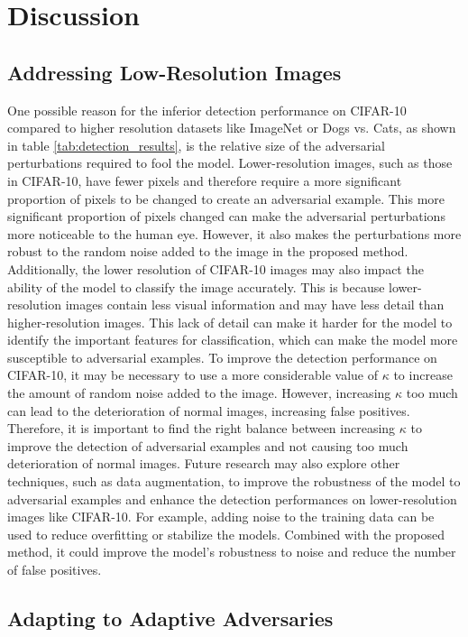 \chapter{Discussion}
\label{discussion}
\overridetextsize

\section{Addressing Low-Resolution Images}

One possible reason for the inferior detection performance on CIFAR-10 compared
to higher resolution datasets like ImageNet or Dogs vs. Cats, as shown in table
\ref{tab:detection_results}, is the relative size of the adversarial
perturbations required to fool the model. Lower-resolution images, such as those
in CIFAR-10, have fewer pixels and therefore require a more significant
proportion of pixels to be changed to create an adversarial example. This more
significant proportion of pixels changed can make the adversarial perturbations
more noticeable to the human eye. However, it also makes the perturbations more
robust to the random noise added to the image in the proposed method.
Additionally, the lower resolution of CIFAR-10 images may also impact the
ability of the model to classify the image accurately. This is because
lower-resolution images contain less visual information and may have less detail
than higher-resolution images. This lack of detail can make it harder for the
model to identify the important features for classification, which can make the
model more susceptible to adversarial examples. To improve the detection
performance on CIFAR-10, it may be necessary to use a more considerable value of
$\kappa$ to increase the amount of random noise added to the image. However,
increasing $\kappa$ too much can lead to the deterioration of normal images,
increasing false positives. Therefore, it is important to find the right balance
between increasing $\kappa$ to improve the detection of adversarial examples and
not causing too much deterioration of normal images. Future research may also
explore other techniques, such as data augmentation, to improve the robustness
of the model to adversarial examples and enhance the detection performances on
lower-resolution images like CIFAR-10. For example, adding noise to the training
data can be used to reduce overfitting or stabilize the models. Combined with
the proposed method, it could improve the model's robustness to noise and reduce
the number of false positives.

\section{Adapting to Adaptive Adversaries}

